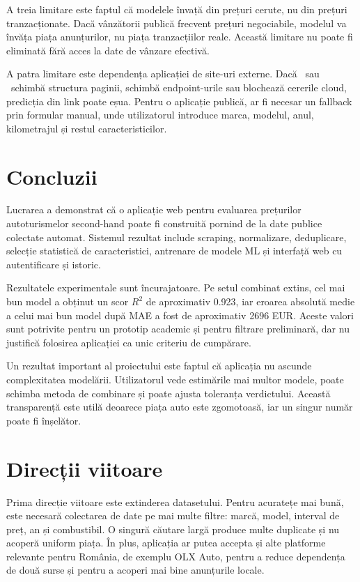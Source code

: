 A treia limitare este faptul că modelele învață din prețuri cerute, nu din prețuri tranzacționate. Dacă vânzătorii publică frecvent prețuri negociabile, modelul va învăța piața anunțurilor, nu piața tranzacțiilor reale. Această limitare nu poate fi eliminată fără acces la date de vânzare efectivă.

A patra limitare este dependența aplicației de site-uri externe. Dacă \autovit\ sau \mobilede\ schimbă structura paginii, schimbă endpoint-urile sau blochează cererile cloud, predicția din link poate eșua. Pentru o aplicație publică, ar fi necesar un fallback prin formular manual, unde utilizatorul introduce marca, modelul, anul, kilometrajul și restul caracteristicilor.

\section{Concluzii}
\label{sec:conclusions-final}

Lucrarea a demonstrat că o aplicație web pentru evaluarea prețurilor autoturismelor second-hand poate fi construită pornind de la date publice colectate automat. Sistemul rezultat include scraping, normalizare, deduplicare, selecție statistică de caracteristici, antrenare de modele ML și interfață web cu autentificare și istoric.

Rezultatele experimentale sunt încurajatoare. Pe setul combinat extins, cel mai bun model a obținut un scor \(R^2\) de aproximativ 0.923, iar eroarea absolută medie a celui mai bun model după MAE a fost de aproximativ 2696 EUR. Aceste valori sunt potrivite pentru un prototip academic și pentru filtrare preliminară, dar nu justifică folosirea aplicației ca unic criteriu de cumpărare.

Un rezultat important al proiectului este faptul că aplicația nu ascunde complexitatea modelării. Utilizatorul vede estimările mai multor modele, poate schimba metoda de combinare și poate ajusta toleranța verdictului. Această transparență este utilă deoarece piața auto este zgomotoasă, iar un singur număr poate fi înșelător.

\section{Direcții viitoare}
\label{sec:conclusions-future}

Prima direcție viitoare este extinderea datasetului. Pentru acuratețe mai bună, este necesară colectarea de date pe mai multe filtre: marcă, model, interval de preț, an și combustibil. O singură căutare largă produce multe duplicate și nu acoperă uniform piața. În plus, aplicația ar putea accepta și alte platforme relevante pentru România, de exemplu OLX Auto, pentru a reduce dependența de două surse și pentru a acoperi mai bine anunțurile locale.

